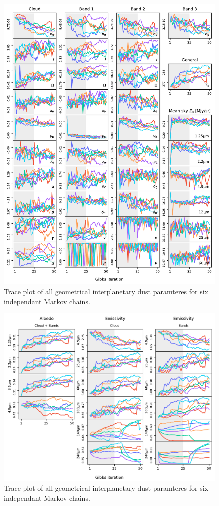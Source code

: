 \documentclass[twocolumn]{aa}
\begin{document}
\begin{figure}
    \centering
    \includegraphics[width=1\textwidth]{figs/total_trace.pdf}
    \caption{Trace plot of all geometrical interplanetary dust paramteres for six independant Markov chains.}
    \label{fig:trace-ipd}
\end{figure}

\begin{figure}
    \centering
    \includegraphics[width=1\textwidth]{figs/emissivity_and_albedo_trace.pdf}
    \caption{Trace plot of all geometrical interplanetary dust paramteres for six independant Markov chains.}
    \label{fig:trace-emissivity-albedo}
\end{figure}
\end{document}
